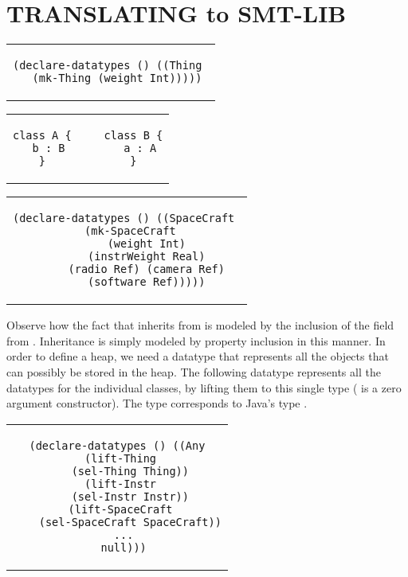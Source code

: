 
\section{TRANSLATING \Klang{} to SMT-LIB}
\label{sec:k2smt}



\lstset{language=SMT,numbers=none}

\begin{center}
\begin{tabular}{c}
\small
\begin{lstlisting}
(declare-datatypes () ((Thing 
  (mk-Thing (weight Int)))))
\end{lstlisting}
\end{tabular}
\end{center}


\lstset{language=K,numbers=none}

\begin{center}
\begin{tabular}{c}
\small
\begin{lstlisting}
class A {     class B {
  b : B         a : A
}             }
\end{lstlisting}
\end{tabular}
\end{center}





\begin{center}
\begin{tabular}{c}
\small
\begin{lstlisting}  
(declare-datatypes () ((SpaceCraft 
  (mk-SpaceCraft 
      (weight Int)
      (instrWeight Real)
      (radio Ref) (camera Ref)
      (software Ref)))))
\end{lstlisting}
\end{tabular}
\end{center}

\noindent Observe how the fact that  inherits from
 is modeled by the inclusion of the  field
from . Inheritance is simply modeled by property
inclusion in this manner.  In order to define a heap, we need a
datatype that represents all the objects that can possibly be stored
in the heap. The following datatype  represents all the
datatypes for the individual classes, by lifting them to this single
type ( is a zero argument constructor). The type 
corresponds to Java's type .

\begin{center}
\begin{tabular}{c}
\small
\begin{lstlisting}
(declare-datatypes () ((Any
  (lift-Thing 
    (sel-Thing Thing))
  (lift-Instr 
    (sel-Instr Instr))
  (lift-SpaceCraft 
    (sel-SpaceCraft SpaceCraft))
  ...
  null)))
\end{lstlisting}
\end{tabular}
\end{center}


